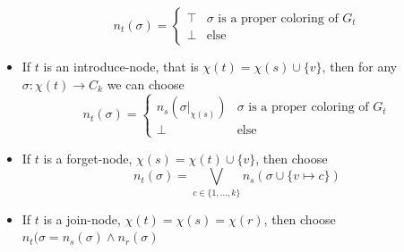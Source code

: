 \documentclass{article}
\begin{document}
\begin{solving}
\begin{itemize}
\begin{equation*}
          n_t(\sigma) = \begin{cases}
            \top & \sigma \text{ is a proper coloring of }G_t\\
            \bot& \text{else}\end{cases}
      \end{equation*}
      \item If $t$ is an introduce-node, that is $\chi(t) = \chi(s)\cup \{v\}$, then for any $\sigma: \chi(t)\to C_k$ we can choose \begin{equation*}
          n_t(\sigma) = \begin{cases}
            n_s(\sigma|_{\chi(s)}) & \sigma \text{ is a proper coloring of } G_t\\
            \bot& \text{else}\end{cases}
      \end{equation*}
      \item If $t$ is a forget-node, $\chi(s) = \chi(t)\cup \{v\}$, then choose \begin{equation*}
          n_t(\sigma) = \bigvee_{c\in \{1, \dots, k\}} n_s(\sigma \cup \{v\mapsto c\})
      \end{equation*}
      \item If $t$ is a join-node, $\chi(t) = \chi(s) = \chi(r)$, then  choose $n_t(\sigma = n_s(\sigma)\land n_r(\sigma)$
  \end{itemize}

\end{solving}
\newpage
\end{document}
